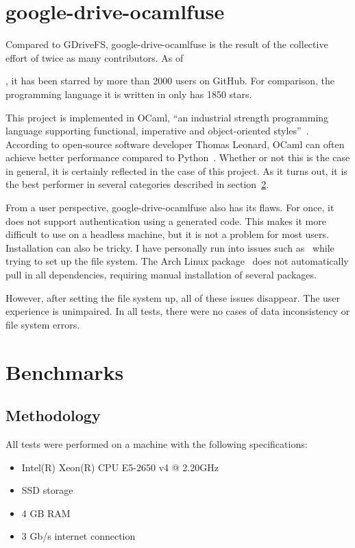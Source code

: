 \section{google-drive-ocamlfuse}

Compared to GDriveFS, google-drive-ocamlfuse is the result of the collective effort of twice as many contributors. As of \date{June 2018}, it has been starred by more than 2000 users on GitHub. For comparison, the programming language it is written in only has 1850 stars.~\cite{ocaml}

This project is implemented in OCaml, ``an industrial strength programming language supporting functional, imperative and object-oriented styles''~\cite{ocaml-website}. According to open-source software developer Thomas Leonard, OCaml can often achieve better performance compared to Python~\cite{python_to_ocaml_retrospective}. Whether or not this is the case in general, it is certainly reflected in the case of this project. As it turns out, it is the best performer in several categories described in section~\ref{benchmarks}.

From a user perspective, google-drive-ocamlfuse also has its flaws. For once, it does not support authentication using a generated code. This makes it more difficult to use on a headless machine, but it is not a problem for most users. Installation can also be tricky. I have personally run into issues such as~\cite{opam-depext-issue} while trying to set up the file system. The Arch Linux package~\cite{google-drive-ocamlfuse-aur} does not automatically pull in all dependencies, requiring manual installation of several packages.

However, after setting the file system up, all of these issues disappear. The user experience is unimpaired. In all tests, there were no cases of data inconsistency or file system errors.

\section{Benchmarks} \label{benchmarks}

\subsection{Methodology}

All tests were performed on a machine with the following specifications:

\begin{itemize}
  \setlength\itemsep{-0.4em}
  \item Intel(R) Xeon(R) CPU E5-2650 v4 @ 2.20GHz
  \item SSD storage
  \item 4 GB RAM
  \item 3 Gb/s internet connection
\end{itemize}

